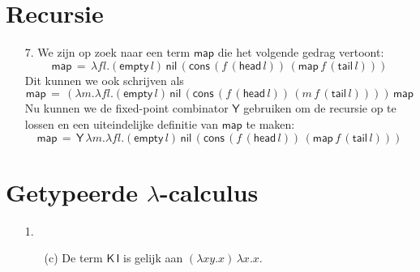 \documentclass[a4paper,11pt]{article}
\begin{document}
\section{Recursie}


\begin{enumerate}


\item[7.]
We zijn op zoek naar een term $\textsf{map}$ die het volgende gedrag vertoont:
\begin{equation*}
\textsf{map} \, = \, \lambda f l. (\textsf{empty} \, l) \, \textsf{nil} \,
(\textsf{cons} \, (f \, (\textsf{head} \, l)) \, (\textsf{map} \, f \, (\textsf{tail} \, l)))
\end{equation*}
Dit kunnen we ook schrijven als
\begin{equation*}
\textsf{map} \, = \, (\lambda m. \lambda f l. (\textsf{empty} \, l) \, \textsf{nil} \,
(\textsf{cons} \, (f \, (\textsf{head} \, l)) \, (m \, f \, (\textsf{tail} \, l)))) \, \textsf{map}
\end{equation*}
Nu kunnen we de fixed-point combinator $\textsf{Y}$ gebruiken om de recursie op te lossen
en een uiteindelijke definitie van $\textsf{map}$ te maken:
\begin{equation*}
\textsf{map} \, = \, \textsf{Y} \, \lambda m. \lambda f l. (\textsf{empty} \, l) \, \textsf{nil} \,
(\textsf{cons} \, (f \, (\textsf{head} \, l)) \, (\textsf{map} \, f \, (\textsf{tail} \, l)))
\end{equation*}


\end{enumerate}


\section{Getypeerde $\lambda$-calculus}


\begin{enumerate}


\item[1.]

\begin{enumerate}

\item[(c)]
De term $\textsf{K} \, \textsf{I}$ is gelijk aan $(\lambda x y. x) \, \lambda x. x$.
\begin{prooftree}
\end{prooftree}

\end{enumerate}


\end{enumerate}
\end{document}
